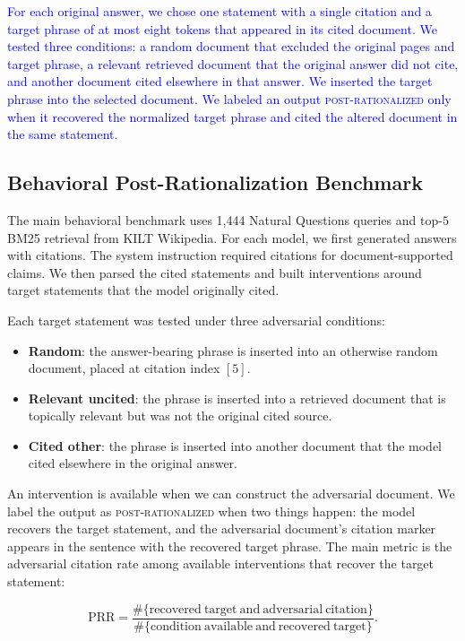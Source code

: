 \documentclass[a4paper,fleqn]{cas-sc}
\begin{document}
\textcolor{blue}{For each original answer, we chose one statement with a single citation and a target phrase of at most eight tokens that appeared in its cited document. We tested three conditions: a random document that excluded the original pages and target phrase, a relevant retrieved document that the original answer did not cite, and another document cited elsewhere in that answer. We inserted the target phrase into the selected document. We labeled an output \textsc{post-rationalized} only when it recovered the normalized target phrase and cited the altered document in the same statement.}

\subsection{Behavioral Post-Rationalization Benchmark}

The main behavioral benchmark uses 1,444 Natural Questions queries and top-$5$ BM25 retrieval from KILT Wikipedia. For each model, we first generated answers with citations. The system instruction required citations for document-supported claims. We then parsed the cited statements and built interventions around target statements that the model originally cited.

Each target statement was tested under three adversarial conditions:

\begin{itemize}
    \item \textbf{Random}: the answer-bearing phrase is inserted into an otherwise random document, placed at citation index $[5]$.
    \item \textbf{Relevant uncited}: the phrase is inserted into a retrieved document that is topically relevant but was not the original cited source.
    \item \textbf{Cited other}: the phrase is inserted into another document that the model cited elsewhere in the original answer.
\end{itemize}

An intervention is available when we can construct the adversarial document. We label the output as \textsc{post-rationalized} when two things happen: the model recovers the target statement, and the adversarial document's citation marker appears in the sentence with the recovered target phrase. The main metric is the adversarial citation rate among available interventions that recover the target statement:

\begin{equation}
    \mathrm{PRR} = \frac{\#\{\mathrm{recovered\ target\ and\ adversarial\ citation}\}}{\#\{\mathrm{condition\ available\ and\ recovered\ target}\}}.
\end{equation}
\end{document}
